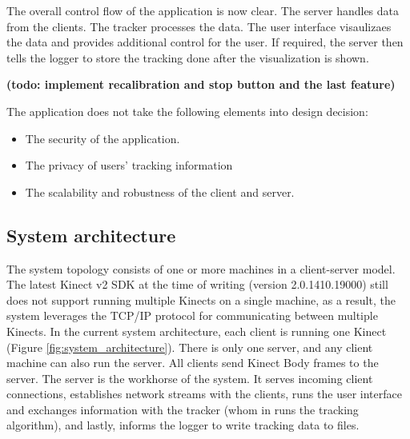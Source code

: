 \documentclass{sigchi}
\begin{document}
The overall control flow of the application is now clear. The server handles data from the clients. The tracker processes the data. The user interface visaulizaes the data and provides additional control for the user. If required, the server then tells the logger to store the tracking done after the visualization is shown.

\textbf{(todo: implement recalibration and stop button and the last feature)}

The application does not take the following elements into design decision:

\begin{itemize}
  \item The security of the application.
  \item The privacy of users' tracking information
  \item The scalability and robustness of the client and server.
\end{itemize}

\subsection{System architecture}

The system topology consists of one or more machines in a client-server model. The latest Kinect v2 SDK at the time of writing (version 2.0.1410.19000) still does not support running multiple Kinects on a single machine, as a result, the system leverages the TCP/IP protocol for communicating between multiple Kinects. In the current system architecture, each client is running one Kinect (Figure \ref{fig:system_architecture}). There is only one server, and any client machine can also run the server. All clients send Kinect Body frames to the server. The server is the workhorse of the system. It serves incoming client connections, establishes network streams with the clients, runs the user interface and exchanges information with the tracker (whom in runs the tracking algorithm), and lastly, informs the logger to write tracking data to files.
\end{document}
